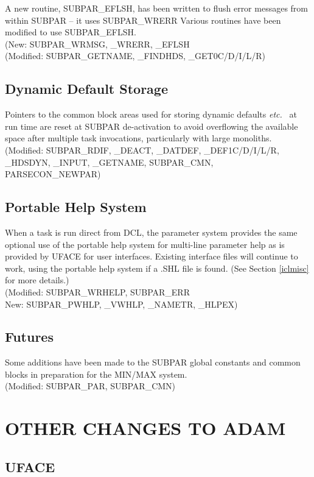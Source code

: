 A new routine, SUBPAR\_EFLSH, has been written to flush error messages from
within SUBPAR -- it uses SUBPAR\_WRERR
Various routines have been modified to use SUBPAR\_EFLSH.\\
(New: SUBPAR\_WRMSG, \_WRERR, \_EFLSH\\
(Modified: SUBPAR\_GETNAME, \_FINDHDS, \_GET0C/D/I/L/R)

\subsection{Dynamic Default Storage}
Pointers to the common block areas used for storing dynamic defaults
{\em etc.\ }
at run time are reset at SUBPAR de-activation to avoid overflowing the
available space after multiple task invocations, particularly with large
monoliths.\\
(Modified: SUBPAR\_RDIF, \_DEACT, \_DATDEF, \_DEF1C/D/I/L/R, \_HDSDYN, \_INPUT,
\_GETNAME, SUBPAR\_CMN, PARSECON\_NEWPAR)

\subsection{Portable Help System}
\label{porthelp}
When a task is run direct from DCL, the parameter system provides the same
optional use of the portable help system for multi-line parameter help as is
provided by UFACE for user interfaces.
Existing interface files will continue to work, using the portable help system
if a .SHL file is found. (See Section \ref{iclmisc} for more details.)\\
(Modified: SUBPAR\_WRHELP, SUBPAR\_ERR\\
New: SUBPAR\_PWHLP, \_VWHLP, \_NAMETR, \_HLPEX)

\subsection{Futures}
Some additions have been made to the SUBPAR global constants and common blocks
in preparation for the MIN/MAX system.\\
(Modified: SUBPAR\_PAR, SUBPAR\_CMN)

\section{OTHER CHANGES TO ADAM}

\subsection{UFACE}
